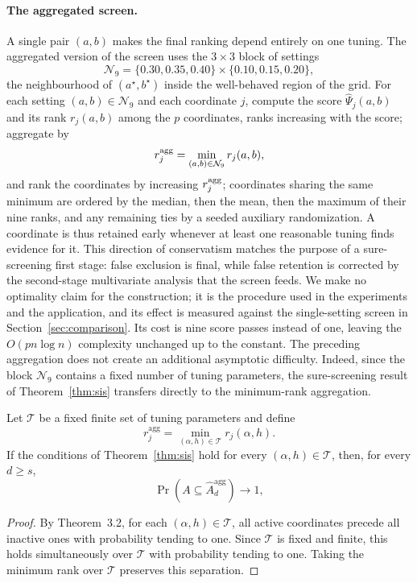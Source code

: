 \paragraph{The aggregated screen.}
A single pair $(a,b)$ makes the final ranking depend entirely on one
tuning. The aggregated version of the screen uses the $3\times3$ block
of settings
\[
 \mathcal N_9=\{0.30,0.35,0.40\}\times\{0.10,0.15,0.20\},
\]
the neighbourhood of $(a^\star,b^\star)$ inside the well-behaved region
of the grid. For each setting $(a,b)\in\mathcal N_9$ and each
coordinate $j$, compute the score $\widehat\Psi_j(a,b)$ and its rank
$r_j(a,b)$ among the $p$ coordinates, ranks increasing with the score;
aggregate by
\[
 r_j^{\rm agg}=\min_{(a,b)\in\mathcal N_9}r_j(a,b),
\]
and rank the coordinates by increasing $r_j^{\rm agg}$; coordinates
sharing the same minimum are ordered by the median, then the mean, then
the maximum of their nine ranks, and any remaining ties by a seeded
auxiliary randomization. A coordinate is thus retained early whenever at least
one reasonable tuning finds evidence for it. This direction of
conservatism matches the purpose of a sure-screening first stage: false
exclusion is final, while false retention is corrected by the
second-stage multivariate analysis that the screen feeds. We make no
optimality claim for the construction; it is the procedure used in the
experiments and the application, and its effect is measured against the
single-setting screen in Section~\ref{sec:comparison}. Its cost is nine
score passes instead of one, leaving the $O(pn\log n)$ complexity
unchanged up to the constant. The preceding aggregation does not create an additional asymptotic difficulty. Indeed, since the block \(\mathcal N_9\) contains a fixed number of tuning parameters, the sure-screening result of Theorem~\ref{thm:sis} transfers directly to the minimum-rank aggregation.

\begin{corollary}
Let $\mathcal T$ be a fixed finite set of tuning parameters and define
\[
r_j^{\mathrm{agg}}
=
\min_{(\alpha,h)\in\mathcal T} r_j(\alpha,h).
\]
If the conditions of Theorem~\ref{thm:sis} hold for every $(\alpha,h)\in\mathcal T$, then, for every $d\ge s$,
\[
\Pr\!\left(A\subseteq \widehat A_d^{\mathrm{agg}}\right)\to 1,
\]
\end{corollary}

\begin{proof}
By Theorem~3.2, for each $(\alpha,h)\in\mathcal T$, all active coordinates precede all inactive ones with probability tending to one. Since $\mathcal T$ is fixed and finite, this holds simultaneously over $\mathcal T$ with probability tending to one. Taking the minimum rank over $\mathcal T$ preserves this separation.
\end{proof}

